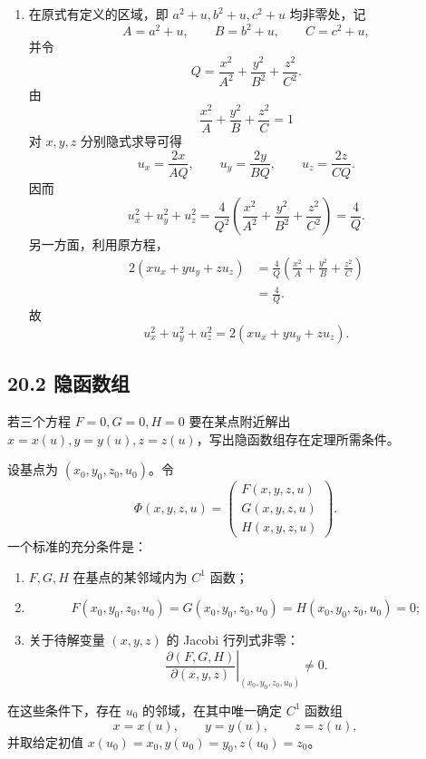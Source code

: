 \begin{xsolution}
\begin{enumerate}[label=(\arabic*)]
  \item 在原式有定义的区域，即 $a^2+u,b^2+u,c^2+u$ 均非零处，记
  \[
    A=a^2+u,\qquad B=b^2+u,\qquad C=c^2+u,
  \]
  并令
  \[
    Q=\frac{x^2}{A^2}+\frac{y^2}{B^2}+\frac{z^2}{C^2}.
  \]
  由
  \[
    \frac{x^2}{A}+\frac{y^2}{B}+\frac{z^2}{C}=1
  \]
  对 $x,y,z$ 分别隐式求导可得
  \[
    u_x=\frac{2x}{AQ},\qquad
    u_y=\frac{2y}{BQ},\qquad
    u_z=\frac{2z}{CQ}.
  \]
  因而
  \[
    u_x^2+u_y^2+u_z^2
    =\frac4{Q^2}
      \left(\frac{x^2}{A^2}+\frac{y^2}{B^2}+\frac{z^2}{C^2}\right)
    =\frac4Q.
  \]
  另一方面，利用原方程，
  \begin{align*}
    2(xu_x+yu_y+zu_z)
    &=\frac4Q\left(\frac{x^2}{A}+\frac{y^2}{B}+\frac{z^2}{C}\right)\\
    &=\frac4Q.
  \end{align*}
  故
  \[
    \boxed{u_x^2+u_y^2+u_z^2=2(xu_x+yu_y+zu_z)}.
  \]
\end{enumerate}
\end{xsolution}

\subsection*{20.2 隐函数组}

\begin{xthought}[20.2.2 思考题 1]
若三个方程 $F=0,G=0,H=0$ 要在某点附近解出 $x=x(u),y=y(u),z=z(u)$，写出隐函数组存在定理所需条件。
\end{xthought}
\begin{xsolution}
设基点为 $(x_0,y_0,z_0,u_0)$。令
\[
  \Phi(x,y,z,u)=
  \begin{pmatrix}
    F(x,y,z,u)\\G(x,y,z,u)\\H(x,y,z,u)
  \end{pmatrix}.
\]
一个标准的充分条件是：
\begin{enumerate}[label=(\arabic*)]
  \item $F,G,H$ 在基点的某邻域内为 $C^1$ 函数；
  \item
  \[
    F(x_0,y_0,z_0,u_0)=G(x_0,y_0,z_0,u_0)
    =H(x_0,y_0,z_0,u_0)=0;
  \]
  \item 关于待解变量 $(x,y,z)$ 的 Jacobi 行列式非零：
  \[
    \boxed{\displaystyle
      \left.
      \frac{\partial(F,G,H)}{\partial(x,y,z)}
      \right|_{(x_0,y_0,z_0,u_0)}\ne0}.
  \]
\end{enumerate}
在这些条件下，存在 $u_0$ 的邻域，在其中唯一确定 $C^1$ 函数组
\[
  x=x(u),\qquad y=y(u),\qquad z=z(u),
\]
并取给定初值 $x(u_0)=x_0,y(u_0)=y_0,z(u_0)=z_0$。
\end{xsolution}

